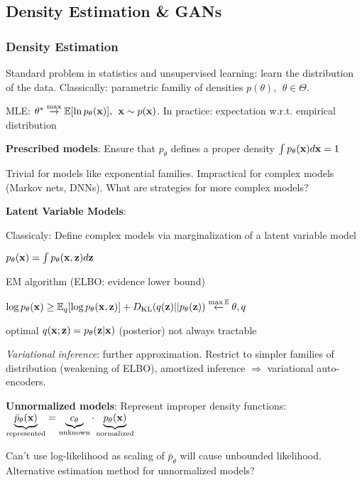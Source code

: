 \subsection{Density Estimation \& GANs}
\label{sub:densityestimationandgams}

\subsubsection{Density Estimation}
\label{ssub:densityestimation}

Standard problem in statistics and unsupervised learning: learn the distribution of the data. Classically: parametric familiy of densities $p(\theta),\>\>\theta\in\Theta$.

MLE: $\theta^* \overset{\text{max}}{\xrightarrow{}} \mathbb E \lbrack \ln p_\theta (\mathbf x) \rbrack,\>\> \mathbf x\sim p(\mathbf x)$. In practice: expectation w.r.t. empirical distribution

\textbf{Prescribed models}: Ensure that $p_\theta$ defines a proper density $\int p_\theta(\mathbf x)d\mathbf x=1$

Trivial for models like exponential families. Impractical for complex models (Markov nets, DNNs). What are strategies for more complex models?

\textbf{Latent Variable Models}:

Classicaly: Define complex models via marginalization of a latent variable model

\tab $p_\theta(\mathbf x)=\int p_\theta(\mathbf x,\mathbf z)d\mathbf z$

EM algorithm (ELBO: evidence lower bound)

\tab $\log p_\theta(\mathbf x)\geq \mathbb E_{q} \lbrack \log p_\theta (\mathbf x,\mathbf z) \rbrack +D_{\text{KL}}(q(\mathbf z)||p_\theta(\mathbf z)) \overset{\max\mathbb E}{\xleftarrow{}}\theta,q$

\tab optimal $q(\mathbf x;\mathbf z)=p_\theta(\mathbf z|\mathbf x)$ (posterior) not always tractable

\emph{Variational inference}: further approximation. Restrict to simpler families of distribution (weakening of ELBO), amortized inference $\Rightarrow$ variational auto-encoders.

\textbf{Unnormalized models}: Represent improper density functions:\\ \tab$\underbrace{\bar{p}_\theta(\mathbf x)}_\text{represented}=\underbrace{c_\theta}_\text{unknown}\cdot \underbrace{p_\theta(\mathbf x)}_\text{normalized}$

Can't use log-likelihood as scaling of $\bar{p}_\theta$ will cause unbounded likelihood. Alternative estimation method for unnormalized models?

